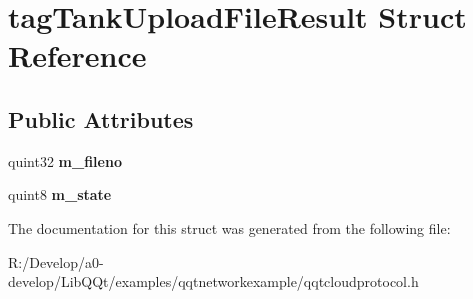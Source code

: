 \hypertarget{structtag_tank_upload_file_result}{}\section{tag\+Tank\+Upload\+File\+Result Struct Reference}
\label{structtag_tank_upload_file_result}
\subsection*{Public Attributes}
\begin{DoxyCompactItemize}
\item 
\mbox{\label{structtag_tank_upload_file_result_a0eb05d238ac54e292fd1bb54894c9456}} 
quint32 {\bfseries m\+\_\+fileno}
\item 
\mbox{\label{structtag_tank_upload_file_result_a9edaf472d6c67eadb48bce841cb77cde}} 
quint8 {\bfseries m\+\_\+state}
\end{DoxyCompactItemize}


The documentation for this struct was generated from the following file\+:\begin{DoxyCompactItemize}
\item 
R\+:/\+Develop/a0-\/develop/\+Lib\+Q\+Qt/examples/qqtnetworkexample/qqtcloudprotocol.\+h\end{DoxyCompactItemize}
